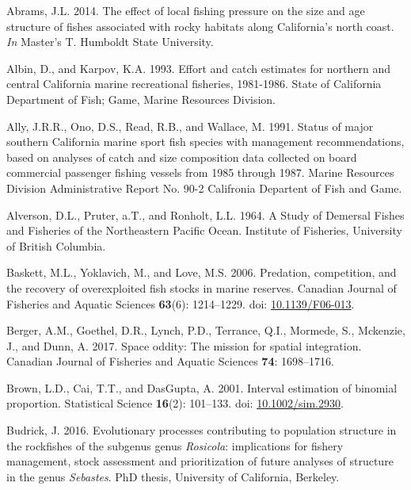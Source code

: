 \documentclass[11pt,
  english,
]{article}
\newlength{\cslhangindent}
\newenvironment{CSLReferences}[2] %
 {%
  \setlength{\parindent}{0pt}
  \ifodd #1 \everypar{\setlength{\hangindent}{\cslhangindent}}\ignorespaces\fi
  \ifnum #2 > 0
  \setlength{\parskip}{#2\baselineskip}
  \fi
 }%
 {}
\begin{document}
\hypertarget{refs}{}
\begin{CSLReferences}{1}{0}
\leavevmode{}%
Abrams, J.L. 2014. {The effect of local fishing pressure on the size and age structure of fishes associated with rocky habitats along California's north coast}. \emph{In} Master's T. Humboldt State University.

\leavevmode{}%
Albin, D., and Karpov, K.A. 1993. {Effort and catch estimates for northern and central California marine recreational fisheries, 1981-1986}. State of California Department of Fish; Game, Marine Resources Division.

\leavevmode{}%
Ally, J.R.R., Ono, D.S., Read, R.B., and Wallace, M. 1991. {Status of major southern California marine sport fish species with management recommendations, based on analyses of catch and size composition data collected on board commercial passenger fishing vessels from 1985 through 1987}. Marine Resources Division Administrative Report No. 90-2 Califronia Departent of Fish and Game.

\leavevmode{}%
Alverson, D.L., Pruter, a.T., and Ronholt, L.L. 1964. {A Study of Demersal Fishes and Fisheries of the Northeastern Pacific Ocean}. Institute of Fisheries, University of British Columbia.

\leavevmode{}%
Baskett, M.L., Yoklavich, M., and Love, M.S. 2006. {Predation, competition, and the recovery of overexploited fish stocks in marine reserves}. Canadian Journal of Fisheries and Aquatic Sciences \textbf{63}(6): 1214--1229. doi: \href{https://doi.org/10.1139/F06-013}{10.1139/F06-013}.

\leavevmode{}%
Berger, A.M., Goethel, D.R., Lynch, P.D., Terrance, Q.I., Mormede, S., Mckenzie, J., and Dunn, A. 2017. {Space oddity: The mission for spatial integration}. Canadian Journal of Fisheries and Aquatic Sciences \textbf{74}: 1698--1716.

\leavevmode{}%
Brown, L.D., Cai, T.T., and DasGupta, A. 2001. {Interval estimation of binomial proportion}. Statistical Science \textbf{16}(2): 101--133. doi: \href{https://doi.org/10.1002/sim.2930}{10.1002/sim.2930}.

\leavevmode{}%
Budrick, J. 2016. {Evolutionary processes contributing to population structure in the rockfishes of the subgenus genus \emph{Rosicola}: implications for fishery management, stock assessment and prioritization of future analyses of structure in the genus \emph{Sebastes}.} PhD thesis, University of California, Berkeley.


\end{CSLReferences}
\end{document}
